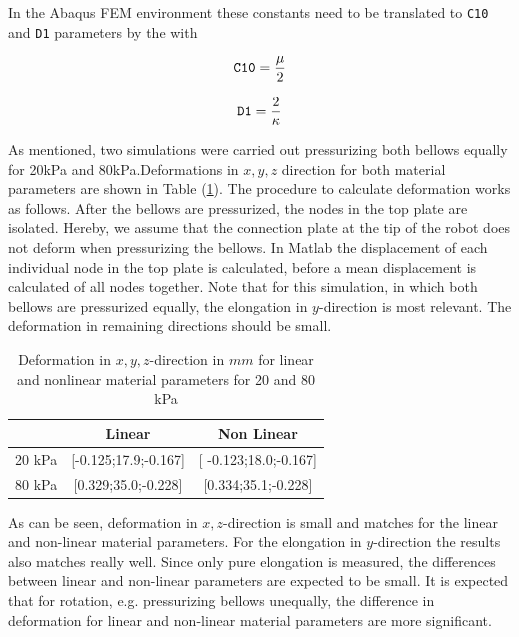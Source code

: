 In the Abaqus FEM environment these constants need to be translated to \verb+C10+ and \verb+D1+ parameters by the with

\begin{equation}
    \verb+C10+ = \frac{\mu}{2}
\end{equation}


\begin{equation}
    \verb+D1+ = \frac{2}{\kappa}
\end{equation}

As mentioned, two simulations were carried out pressurizing both bellows equally for 20kPa and 80kPa.Deformations in $x,y,z$ direction for both material parameters are shown in Table (\ref{tab2:linnonlindef}). The procedure to calculate deformation works as follows. After the bellows are pressurized, the nodes in the top plate are isolated. Hereby, we assume that the connection plate at the tip of the robot does not deform when pressurizing the bellows. In Matlab the displacement of each individual node in the top plate is calculated, before a mean displacement is calculated of all nodes together. Note that for this simulation, in which both bellows are pressurized equally, the elongation in $y$-direction is most relevant. The deformation in remaining directions should be small.

\begin{table}[H]
    \centering
    \begin{tabular}{|c|c|c|}  \hline
    & \textbf{Linear}    &  \textbf{Non Linear}    \\ \hline
      [x;y;z] 20 kPa   &  [-0.125;17.9;-0.167]     &         [ -0.123;18.0;-0.167]           \\ \hline
     [x,y,z] 80 kPa   &  [0.329;35.0;-0.228]    &       [0.334;35.1;-0.228]             \\ \hline
    \end{tabular}
    \caption{Deformation in  $x,y,z$-direction in $mm$ for linear and nonlinear material parameters for 20 and 80 kPa}
    \label{tab2:linnonlindef}
\end{table}

As can be seen, deformation in $x,z$-direction is small and matches for the linear and non-linear material parameters. For the elongation in $y$-direction the results also matches really well. Since only pure elongation is measured, the differences between linear and non-linear parameters are expected to be small. It is expected that for rotation, e.g. pressurizing bellows unequally, the difference in deformation for linear and non-linear material parameters are more significant.





